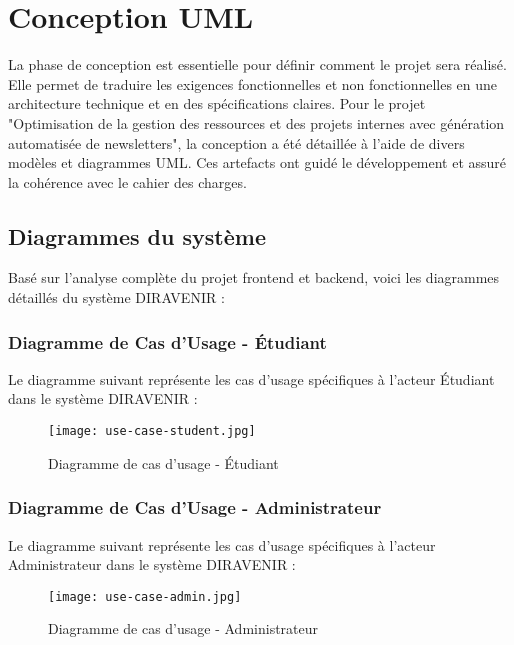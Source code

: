 \documentclass[12pt,a4paper]{report}
\begin{document}
\section{Conception UML}

La phase de conception est essentielle pour définir comment le projet sera réalisé. Elle permet de traduire les exigences fonctionnelles et non fonctionnelles en une architecture technique et en des spécifications claires. Pour le projet "Optimisation de la gestion des ressources et des projets internes avec génération automatisée de newsletters", la conception a été détaillée à l'aide de divers modèles et diagrammes UML. Ces artefacts ont guidé le développement et assuré la cohérence avec le cahier des charges.

\subsection{Diagrammes du système}

Basé sur l'analyse complète du projet frontend et backend, voici les diagrammes détaillés du système DIRAVENIR :

\subsubsection{Diagramme de Cas d'Usage - Étudiant}

Le diagramme suivant représente les cas d'usage spécifiques à l'acteur Étudiant dans le système DIRAVENIR :

\begin{figure}[H]
\centering
\texttt{[image: use-case-student.jpg]}
\caption{Diagramme de cas d'usage - Étudiant}
\label{fig:diagramme_cas_utilisation_etudiant}
\end{figure}

\subsubsection{Diagramme de Cas d'Usage - Administrateur}

Le diagramme suivant représente les cas d'usage spécifiques à l'acteur Administrateur dans le système DIRAVENIR :

\begin{figure}[H]
\centering
\texttt{[image: use-case-admin.jpg]}
\caption{Diagramme de cas d'usage - Administrateur}
\label{fig:diagramme_cas_utilisation_admin}
\end{figure}
\end{document}
